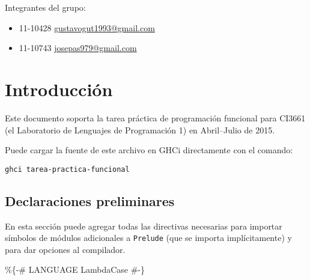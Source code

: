 Integrantes del grupo:

\begin{itemize}
\itemsep1pt\parskip0pt
\item
  11-10428
  \href{mailto:gustavogut1993@gmail.com}{gustavogut1993@gmail.com}
\item
  11-10743 \href{mailto:josepas979@gmail.com}{josepas979@gmail.com}
\end{itemize}

\section{Introducción}\label{introducciuxf3n}

Este documento soporta la tarea práctica de programación funcional para
CI3661 (el Laboratorio de Lenguajes de Programación 1) en Abril--Julio
de 2015.

Puede cargar la fuente de este archivo en GHCi directamente con el
comando:

\begin{verbatim}
ghci tarea-practica-funcional
\end{verbatim}

\subsection{Declaraciones
preliminares}\label{declaraciones-preliminares}

En esta sección puede agregar todas las directivas necesarias para
importar símbolos de módulos adicionales a \texttt{Prelude} (que se
importa implícitamente) y para dar opciones al compilador.

\begin{Shaded}
\begin{Highlighting}[]
\end{Highlighting}
\end{Shaded}

\%\{-\# LANGUAGE LambdaCase \#-\}

\begin{Shaded}
\begin{Highlighting}[]

 
     \NormalTok{(}\NormalTok{, ($!!))}
       
            \NormalTok{(}
        \NormalTok{(}\NormalTok{)}
  
           
\end{Highlighting}
\end{Shaded}

